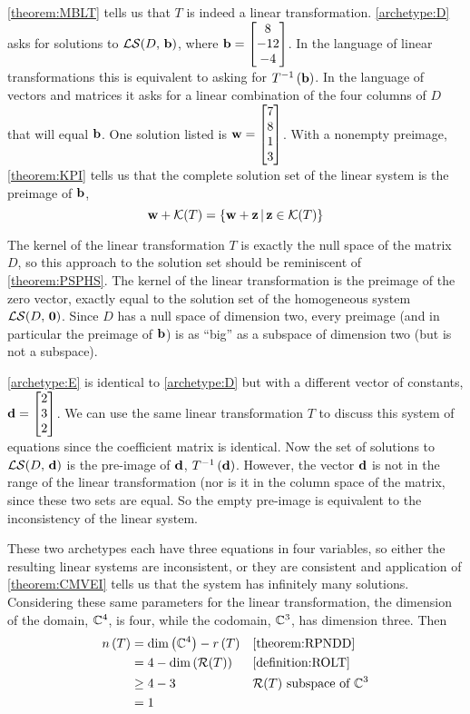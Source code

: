 \documentclass{ximera}
\begin{document}
\ref{theorem:MBLT} tells us that $T$ is indeed a linear transformation.  \ref{archetype:D} asks for solutions to $\mathcal{LS}\!\left(D,\,\mathbf{b}\right)$, where $\mathbf{b}=\begin{bmatrix}8\\-12\\-4\end{bmatrix}$.  In the language of linear transformations this is equivalent to asking for $T^{-1}\left(\mathbf{b}\right)$.  In the language of vectors and matrices it asks for a linear combination of the four columns of $D$ that will equal $\mathbf{b}$.   One solution listed is $\mathbf{w}=\begin{bmatrix}7\\8\\1\\3\end{bmatrix}$.  With a nonempty preimage, \ref{theorem:KPI} tells us that the complete solution set of the linear system is the preimage of $\mathbf{b}$,
\[
\mathbf{w}+\mathcal{K}\!\left(T\right)=\left\lbrace\mathbf{w}+\mathbf{z}\,\middle|\,\mathbf{z}\in\mathcal{K}\!\left(T\right)\right\rbrace
\]




The kernel of the linear transformation $T$ is exactly the null space of the matrix $D$, so this approach to the solution set should be reminiscent of \ref{theorem:PSPHS}.  The kernel of the linear transformation is the preimage of the zero vector, exactly equal to the solution set of the homogeneous system $\mathcal{LS}\!\left(D,\,\mathbf{0}\right)$.  Since $D$ has a null space of dimension two, every preimage (and in particular the preimage of $\mathbf{b}$) is as ``big'' as a subspace of dimension two (but is not a subspace).



\ref{archetype:E} is identical to \ref{archetype:D} but with a different vector of constants, $\mathbf{d}=\begin{bmatrix}2\\3\\2\end{bmatrix}$.  We can use the same linear transformation $T$ to discuss this system of equations since the coefficient matrix is identical.  Now the set of solutions to $\mathcal{LS}\!\left(D,\,\mathbf{d}\right)$  is the pre-image of $\mathbf{d}$, $T^{-1}\left(\mathbf{d}\right)$.  However, the vector $\mathbf{d}$ is not in the range of the linear transformation (nor is it in the column space of the matrix, since these two sets are equal.  So the empty pre-image is equivalent to the inconsistency of the linear system.



These two archetypes each have three equations in four variables, so either the resulting linear systems are inconsistent, or they are consistent and application of \ref{theorem:CMVEI} tells us that the system has infinitely many solutions.  Considering these same parameters for the linear transformation, the dimension of the domain, $\mathbb{C}^{4}$, is four, while the codomain, $\mathbb{C}^{3}$, has dimension three.  Then
\begin{align*}
n\left(T\right)&=\dim\left(\mathbb{C}^{4}\right)-r\left(T\right)&&\ref{theorem:RPNDD}\\
&=4-\dim\left(\mathcal{R}\!\left(T\right)\right)&&\ref{definition:ROLT}\\
&\geq 4-3&&\text{$\mathcal{R}\!\left(T\right)$ subspace of $\mathbb{C}^{3}$}\\
&=1
\end{align*}
\end{document}
